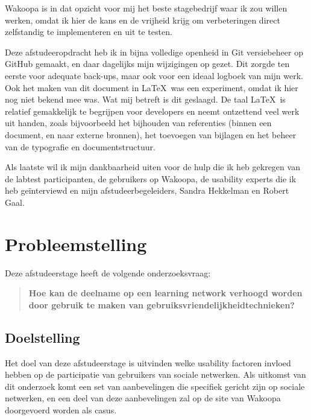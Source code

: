 \documentclass[a4paper, 10pt, pdftex]{report}
\begin{document}
    Wakoopa is in dat opzicht voor mij het beste stagebedrijf waar ik zou willen werken, omdat ik hier de kans en de vrijheid krijg om verbeteringen direct zelfstandig te implementeren en uit te testen.

    Deze afstudeeropdracht heb ik in bijna volledige openheid in Git versiebeheer op GitHub gemaakt, en daar dagelijks mijn wijzigingen op gezet. Dit zorgde ten eerste voor adequate back-ups, maar ook voor een ideaal logboek van mijn werk. Ook het maken van dit document in \LaTeX~was een experiment, omdat ik hier nog niet bekend mee was. Wat mij betreft is dit geslaagd. De taal \LaTeX~is relatief gemakkelijk te begrijpen voor developers en neemt ontzettend veel werk uit handen, zoals bijvoorbeeld het bijhouden van referenties (binnen een document, en naar externe bronnen), het toevoegen van bijlagen en het beheer van de typografie en documentstructuur.

    Als laatste wil ik mijn dankbaarheid uiten voor de hulp die ik heb gekregen van de labtest participanten, de gebruikers op Wakoopa, de usability experts die ik heb ge\"interviewd en mijn afstudeerbegeleiders, Sandra Hekkelman en Robert Gaal.

  \newpage
  \section*{Probleemstelling}
    Deze afstudeerstage heeft de volgende onderzoeksvraag:
    \begin{quotation}
     \textbf{Hoe kan de deelname op een learning network verhoogd worden door gebruik te maken van gebruiksvriendelijkheidtechnieken?}
    \end{quotation}

    \subsection*{Doelstelling}

    Het doel van deze afstudeerstage is uitvinden welke usability factoren invloed hebben op de participatie van gebruikers van sociale netwerken. Als uitkomst van dit onderzoek komt een set van aanbevelingen die specifiek gericht zijn op sociale netwerken, en een deel van deze aanbevelingen zal op de site van Wakoopa doorgevoerd worden als casus.
\end{document}
